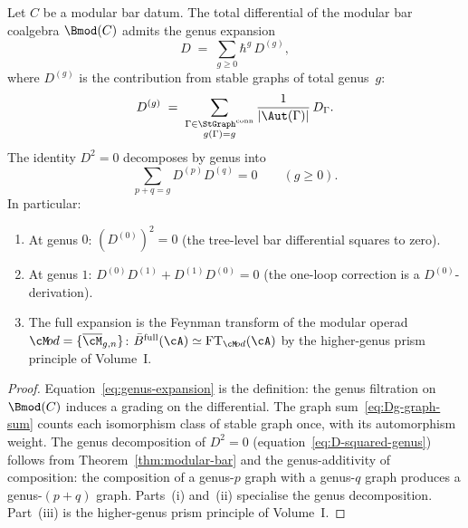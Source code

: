 \begin{theorem}
\label{thm:formal-genus-expansion}
Let $C$ be a modular bar datum. The total differential of the
modular bar coalgebra $\Bmod(C)$ admits the genus expansion
\begin{equation}\label{eq:genus-expansion}
D \;=\; \sum_{g \ge 0} \hbar^g\, D^{(g)},
\end{equation}
where $D^{(g)}$ is the contribution from stable graphs of total
genus~$g$:
\begin{equation}\label{eq:Dg-graph-sum}
D^{(g)} \;=\; \sum_{\substack{\Gamma \in
\StGraph^{\mathrm{conn}} \\ g(\Gamma) = g}}
\frac{1}{|\Aut(\Gamma)|}\, D_\Gamma.
\end{equation}
The identity $D^2 = 0$ decomposes by genus into
\begin{equation}\label{eq:D-squared-genus}
\sum_{p+q=g} D^{(p)} D^{(q)} = 0
\qquad (g \ge 0).
\end{equation}
In particular:
\begin{enumerate}[label=\textup{(\roman*)}]
\item At genus $0$: $(D^{(0)})^2 = 0$
 \textup{(}the tree-level bar differential squares to zero\textup{)}.
\item At genus $1$:
 $D^{(0)} D^{(1)} + D^{(1)} D^{(0)} = 0$
 \textup{(}the one-loop correction is a $D^{(0)}$-derivation\textup{)}.
\item The full expansion is the Feynman transform of the modular operad
 $\cM\!od = \{\overline{\cM}_{g,n}\}$\textup{:}
 $\bar B^{\mathrm{full}}(\cA) \simeq \mathrm{FT}_{\cM\!od}(\cA)$
 by the higher-genus prism principle of Volume~I.
\end{enumerate}
\end{theorem}

\begin{proof}
Equation~\eqref{eq:genus-expansion} is the definition: the genus
filtration on $\Bmod(C)$ induces a grading on the differential.
The graph sum~\eqref{eq:Dg-graph-sum} counts each isomorphism class
of stable graph once, with its automorphism weight.
The genus decomposition of $D^2 = 0$
(equation~\eqref{eq:D-squared-genus}) follows from
Theorem~\ref{thm:modular-bar} and the genus-additivity of
composition: the composition of a genus-$p$ graph with a genus-$q$
graph produces a genus-$(p+q)$ graph. Parts~(i) and~(ii)
specialise the genus decomposition. Part~(iii) is the
higher-genus prism principle of Volume~I.
\end{proof}

